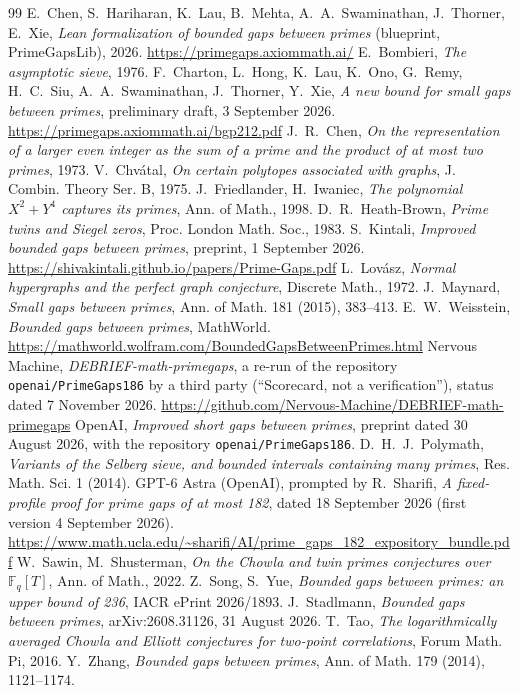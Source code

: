 \begin{thebibliography}{99}
 E.~Chen, S.~Hariharan, K.~Lau, B.~Mehta, A.~A.~Swaminathan,
J.~Thorner, E.~Xie, \emph{Lean formalization of bounded gaps between primes}
(blueprint, PrimeGapsLib), 2026. \url{https://primegaps.axiommath.ai/}
 E.~Bombieri, \emph{The asymptotic sieve}, 1976.
 F.~Charton, L.~Hong, K.~Lau, K.~Ono, G.~Remy, H.~C.~Siu,
A.~A.~Swaminathan, J.~Thorner, Y.~Xie, \emph{A new bound for small gaps
between primes}, preliminary draft, 3 September 2026.
\url{https://primegaps.axiommath.ai/bgp212.pdf}
 J.~R.~Chen, \emph{On the representation of a larger even
integer as the sum of a prime and the product of at most two primes}, 1973.
 V.~Chv\'atal, \emph{On certain polytopes associated with
graphs}, J. Combin. Theory Ser. B, 1975.
 J.~Friedlander, H.~Iwaniec, \emph{The polynomial $X^2+Y^4$
captures its primes}, Ann. of Math., 1998.
 D.~R.~Heath-Brown, \emph{Prime twins and Siegel zeros}, Proc.
London Math. Soc., 1983.
 S.~Kintali, \emph{Improved bounded gaps between primes},
preprint, 1 September 2026.
\url{https://shivakintali.github.io/papers/Prime-Gaps.pdf}
 L.~Lov\'asz, \emph{Normal hypergraphs and the perfect graph
conjecture}, Discrete Math., 1972.
 J.~Maynard, \emph{Small gaps between primes}, Ann. of Math.
181 (2015), 383--413.
 E.~W.~Weisstein, \emph{Bounded gaps between primes}, MathWorld.
\url{https://mathworld.wolfram.com/BoundedGapsBetweenPrimes.html}
 Nervous Machine, \emph{DEBRIEF-math-primegaps}, a re-run of
the repository \texttt{openai/PrimeGaps186} by a third party (``Scorecard, not
a verification''), status dated 7 November 2026.
\url{https://github.com/Nervous-Machine/DEBRIEF-math-primegaps}
 OpenAI, \emph{Improved short gaps between primes}, preprint
dated 30 August 2026, with the repository \texttt{openai/PrimeGaps186}.
 D.~H.~J.~Polymath, \emph{Variants of the Selberg sieve, and
bounded intervals containing many primes}, Res. Math. Sci. 1 (2014).
 GPT-6 Astra (OpenAI), prompted by R.~Sharifi, \emph{A
fixed-profile proof for prime gaps of at most 182}, dated 18 September 2026
(first version 4 September 2026).
\url{https://www.math.ucla.edu/~sharifi/AI/prime_gaps_182_expository_bundle.pdf}
 W.~Sawin, M.~Shusterman, \emph{On the Chowla and twin primes
conjectures over $\mathbb F_q[T]$}, Ann. of Math., 2022.
 Z.~Song, S.~Yue, \emph{Bounded gaps between primes: an upper
bound of 236}, IACR ePrint 2026/1893.
 J.~Stadlmann, \emph{Bounded gaps between primes},
arXiv:2608.31126, 31 August 2026.
 T.~Tao, \emph{The logarithmically averaged Chowla and Elliott
conjectures for two-point correlations}, Forum Math. Pi, 2016.
 Y.~Zhang, \emph{Bounded gaps between primes}, Ann. of Math.
179 (2014), 1121--1174.
\end{thebibliography}

